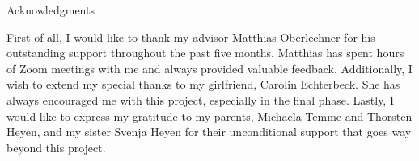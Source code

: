\thispagestyle{empty}

\vspace*{20mm}

\begin{center}
{ Acknowledgments}
\end{center}

\vspace{10mm}

First of all, I would like to thank my advisor Matthias Oberlechner for his outstanding support throughout the past five months. Matthias has spent hours of Zoom meetings with me and always provided valuable feedback. Additionally, I wish to extend my special thanks to my girlfriend, Carolin Echterbeck. She has always encouraged me with this project, especially in the final phase. Lastly, I would like to express my gratitude to my parents, Michaela Temme and Thorsten Heyen, and my sister Svenja Heyen for their unconditional support that goes way beyond this project.

\cleardoublepage{}
